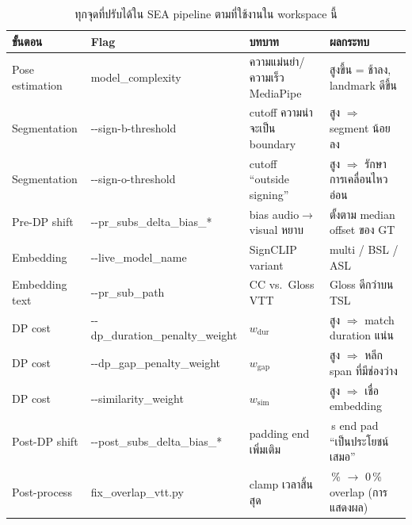 \documentclass[11pt,a4paper]{article}
\def\texttt#1{#1}%
\def\textbf#1{#1}%
\begin{document}
\begin{table}[h]
\centering
\small
\begin{tabularx}{\linewidth}{@{}>{\raggedright\arraybackslash}p{22mm}
                              >{\raggedright\arraybackslash}p{47mm}
                              >{\raggedright\arraybackslash}X
                              >{\raggedright\arraybackslash}X@{}}
\toprule
\textbf{ขั้นตอน} & \textbf{Flag} & \textbf{บทบาท} & \textbf{ผลกระทบ} \\
\midrule
Pose estimation     & \texttt{model\_complexity}            & ความแม่นยำ/ความเร็ว MediaPipe & สูงขึ้น = ช้าลง, landmark ดีขึ้น \\
Segmentation        & \texttt{-{}-sign-b-threshold}         & cutoff ความน่าจะเป็น boundary & สูง $\Rightarrow$ segment น้อยลง \\
Segmentation        & \texttt{-{}-sign-o-threshold}         & cutoff ``outside signing''   & สูง $\Rightarrow$ รักษาการเคลื่อนไหวอ่อน \\
Pre-DP shift        & \texttt{-{}-pr\_subs\_delta\_bias\_*} & bias audio$\to$visual หยาบ  & ตั้งตาม median offset ของ GT \\
Embedding           & \texttt{-{}-live\_model\_name}        & SignCLIP variant             & multi / BSL / ASL \\
Embedding text      & \texttt{-{}-pr\_sub\_path}            & CC vs.\ Gloss VTT            & Gloss ดีกว่าบน TSL \\
DP cost             & \texttt{-{}-dp\_duration\_penalty\_weight} & $w_{\mathrm{dur}}$      & สูง $\Rightarrow$ match duration แน่น \\
DP cost             & \texttt{-{}-dp\_gap\_penalty\_weight} & $w_{\mathrm{gap}}$           & สูง $\Rightarrow$ หลีก span ที่มีช่องว่าง \\
DP cost             & \texttt{-{}-similarity\_weight}       & $w_{\mathrm{sim}}$           & สูง $\Rightarrow$ เชื่อ embedding \\
Post-DP shift       & \texttt{-{}-post\_subs\_delta\_bias\_*} & padding end เพิ่มเติม      & 1\,s end pad ``เป็นประโยชน์เสมอ'' \\
Post-process        & \texttt{fix\_overlap\_vtt.py}         & clamp เวลาสิ้นสุด            & 88\,\% $\to$ 0\,\% overlap (การแสดงผล) \\
\bottomrule
\end{tabularx}
\caption{ทุกจุดที่ปรับได้ใน SEA pipeline ตามที่ใช้งานใน workspace นี้}
\label{tab:tunable}
\end{table}
\end{document}
